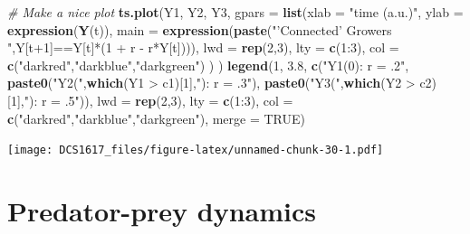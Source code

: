 \documentclass[]{book}
\newenvironment{Shaded}{\begin{snugshade}}{\end{snugshade}}
\newcommand{\KeywordTok}[1]{\textcolor[rgb]{0.13,0.29,0.53}{\textbf{{#1}}}}
\newcommand{\DataTypeTok}[1]{\textcolor[rgb]{0.13,0.29,0.53}{{#1}}}
\newcommand{\DecValTok}[1]{\textcolor[rgb]{0.00,0.00,0.81}{{#1}}}
\newcommand{\FloatTok}[1]{\textcolor[rgb]{0.00,0.00,0.81}{{#1}}}
\newcommand{\StringTok}[1]{\textcolor[rgb]{0.31,0.60,0.02}{{#1}}}
\newcommand{\CommentTok}[1]{\textcolor[rgb]{0.56,0.35,0.01}{\textit{{#1}}}}
\newcommand{\OtherTok}[1]{\textcolor[rgb]{0.56,0.35,0.01}{{#1}}}
\newcommand{\NormalTok}[1]{{#1}}
\let\stdsection\section
\renewcommand\section{\newpage\stdsection}
\begin{document}
\begin{Shaded}
\begin{Highlighting}[]
\CommentTok{# Make a nice plot}
\KeywordTok{ts.plot}\NormalTok{(Y1, Y2, Y3,}
        \DataTypeTok{gpars =} \KeywordTok{list}\NormalTok{(}\DataTypeTok{xlab =} \StringTok{"time (a.u.)"}\NormalTok{,}
                     \DataTypeTok{ylab =} \KeywordTok{expression}\NormalTok{(}\KeywordTok{Y}\NormalTok{(t)),}
                     \DataTypeTok{main =} \KeywordTok{expression}\NormalTok{(}\KeywordTok{paste}\NormalTok{(}\StringTok{"'Connected' Growers "}\NormalTok{,Y[t}\DecValTok{+1}\NormalTok{]==Y[t]*(}\DecValTok{1} \NormalTok{+}\StringTok{ }\NormalTok{r -}\StringTok{ }\NormalTok{r*Y[t]))),}
                     \DataTypeTok{lwd =} \KeywordTok{rep}\NormalTok{(}\DecValTok{2}\NormalTok{,}\DecValTok{3}\NormalTok{),}
                     \DataTypeTok{lty =} \KeywordTok{c}\NormalTok{(}\DecValTok{1}\NormalTok{:}\DecValTok{3}\NormalTok{),}
                     \DataTypeTok{col =} \KeywordTok{c}\NormalTok{(}\StringTok{"darkred"}\NormalTok{,}\StringTok{"darkblue"}\NormalTok{,}\StringTok{"darkgreen"}\NormalTok{)}
                     \NormalTok{)}
        \NormalTok{)}
\KeywordTok{legend}\NormalTok{(}\DecValTok{1}\NormalTok{, }\FloatTok{3.8}\NormalTok{, }\KeywordTok{c}\NormalTok{(}\StringTok{"Y1(0):  r = .2"}\NormalTok{,}
                 \KeywordTok{paste0}\NormalTok{(}\StringTok{"Y2("}\NormalTok{,}\KeywordTok{which}\NormalTok{(Y1 >}\StringTok{ }\NormalTok{c1)[}\DecValTok{1}\NormalTok{],}\StringTok{"): r = .3"}\NormalTok{), }
                 \KeywordTok{paste0}\NormalTok{(}\StringTok{"Y3("}\NormalTok{,}\KeywordTok{which}\NormalTok{(Y2 >}\StringTok{ }\NormalTok{c2)[}\DecValTok{1}\NormalTok{],}\StringTok{"): r = .5"}\NormalTok{)),}
       \DataTypeTok{lwd =} \KeywordTok{rep}\NormalTok{(}\DecValTok{2}\NormalTok{,}\DecValTok{3}\NormalTok{), }\DataTypeTok{lty =} \KeywordTok{c}\NormalTok{(}\DecValTok{1}\NormalTok{:}\DecValTok{3}\NormalTok{), }\DataTypeTok{col =} \KeywordTok{c}\NormalTok{(}\StringTok{"darkred"}\NormalTok{,}\StringTok{"darkblue"}\NormalTok{,}\StringTok{"darkgreen"}\NormalTok{), }\DataTypeTok{merge =} \OtherTok{TRUE}\NormalTok{)}
\end{Highlighting}
\end{Shaded}

\texttt{[image: DCS1617\_files/figure-latex/unnamed-chunk-30-1.pdf]}

\section{\texorpdfstring{\textbf{Predator-prey
dynamics}}{Predator-prey dynamics}}\label{predator-prey-dynamics}
\end{document}
